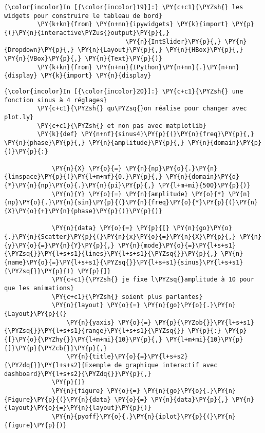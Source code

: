     
    
    \begin{Verbatim}[commandchars=\\\{\}]
{\color{incolor}In [{\color{incolor}19}]:} \PY{c+c1}{\PYZsh{} les widgets pour construire le tableau de bord}
         \PY{k+kn}{from} \PY{n+nn}{ipywidgets} \PY{k}{import} \PY{p}{(}\PY{n}{interactive\PYZus{}output}\PY{p}{,}
                                 \PY{n}{IntSlider}\PY{p}{,} \PY{n}{Dropdown}\PY{p}{,} \PY{n}{Layout}\PY{p}{,} \PY{n}{HBox}\PY{p}{,} \PY{n}{VBox}\PY{p}{,} \PY{n}{Text}\PY{p}{)}
         \PY{k+kn}{from} \PY{n+nn}{IPython}\PY{n+nn}{.}\PY{n+nn}{display} \PY{k}{import} \PY{n}{display}
\end{Verbatim}


    \begin{Verbatim}[commandchars=\\\{\}]
{\color{incolor}In [{\color{incolor}20}]:} \PY{c+c1}{\PYZsh{} une fonction sinus à 4 réglages}
         \PY{c+c1}{\PYZsh{} qu\PYZsq{}on réalise pour changer avec plot.ly}
         \PY{c+c1}{\PYZsh{} et non pas avec matplotlib}
         \PY{k}{def} \PY{n+nf}{sinus4}\PY{p}{(}\PY{n}{freq}\PY{p}{,} \PY{n}{phase}\PY{p}{,} \PY{n}{amplitude}\PY{p}{,} \PY{n}{domain}\PY{p}{)}\PY{p}{:}
         
             \PY{n}{X} \PY{o}{=} \PY{n}{np}\PY{o}{.}\PY{n}{linspace}\PY{p}{(}\PY{l+m+mf}{0.}\PY{p}{,} \PY{n}{domain}\PY{o}{*}\PY{n}{np}\PY{o}{.}\PY{n}{pi}\PY{p}{,} \PY{l+m+mi}{500}\PY{p}{)}
             \PY{n}{Y} \PY{o}{=} \PY{n}{amplitude} \PY{o}{*} \PY{n}{np}\PY{o}{.}\PY{n}{sin}\PY{p}{(}\PY{n}{freq}\PY{o}{*}\PY{p}{(}\PY{n}{X}\PY{o}{+}\PY{n}{phase}\PY{p}{)}\PY{p}{)}
         
             \PY{n}{data} \PY{o}{=} \PY{p}{[} \PY{n}{go}\PY{o}{.}\PY{n}{Scatter}\PY{p}{(}\PY{n}{x}\PY{o}{=}\PY{n}{X}\PY{p}{,} \PY{n}{y}\PY{o}{=}\PY{n}{Y}\PY{p}{,} \PY{n}{mode}\PY{o}{=}\PY{l+s+s1}{\PYZsq{}}\PY{l+s+s1}{lines}\PY{l+s+s1}{\PYZsq{}}\PY{p}{,} \PY{n}{name}\PY{o}{=}\PY{l+s+s1}{\PYZsq{}}\PY{l+s+s1}{sinus}\PY{l+s+s1}{\PYZsq{}}\PY{p}{)} \PY{p}{]}
             \PY{c+c1}{\PYZsh{} je fixe l\PYZsq{}amplitude à 10 pour que les animations}
             \PY{c+c1}{\PYZsh{} soient plus parlantes}
             \PY{n}{layout} \PY{o}{=} \PY{n}{go}\PY{o}{.}\PY{n}{Layout}\PY{p}{(}
                 \PY{n}{yaxis} \PY{o}{=} \PY{p}{\PYZob{}}\PY{l+s+s1}{\PYZsq{}}\PY{l+s+s1}{range}\PY{l+s+s1}{\PYZsq{}} \PY{p}{:} \PY{p}{[}\PY{o}{\PYZhy{}}\PY{l+m+mi}{10}\PY{p}{,} \PY{l+m+mi}{10}\PY{p}{]}\PY{p}{\PYZcb{}}\PY{p}{,}
                 \PY{n}{title}\PY{o}{=}\PY{l+s+s2}{\PYZdq{}}\PY{l+s+s2}{Exemple de graphique interactif avec dashboard}\PY{l+s+s2}{\PYZdq{}}\PY{p}{,}
             \PY{p}{)}
             \PY{n}{figure} \PY{o}{=} \PY{n}{go}\PY{o}{.}\PY{n}{Figure}\PY{p}{(}\PY{n}{data} \PY{o}{=} \PY{n}{data}\PY{p}{,} \PY{n}{layout}\PY{o}{=}\PY{n}{layout}\PY{p}{)}
             \PY{n}{pyoff}\PY{o}{.}\PY{n}{iplot}\PY{p}{(}\PY{n}{figure}\PY{p}{)}
\end{Verbatim}


